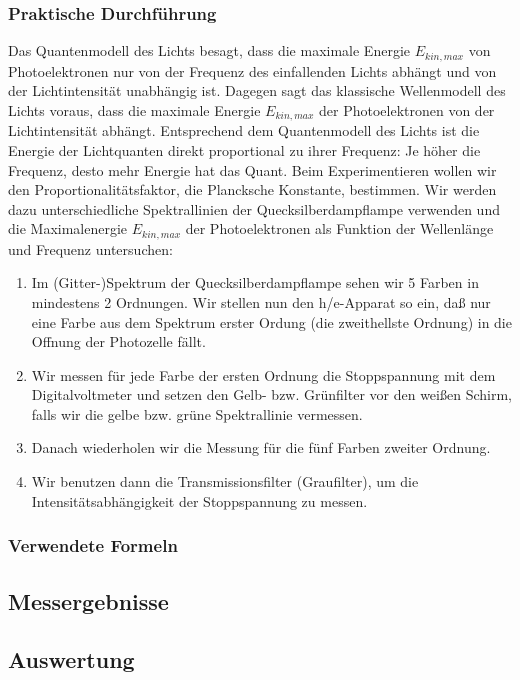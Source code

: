 \documentclass[12pt]{scrartcl}
\begin{document}
\subsubsection{Praktische Durchführung}
Das Quantenmodell des Lichts besagt, dass die maximale Energie $E_{kin,max}$ von Photoelektronen nur von der Frequenz des einfallenden Lichts abhängt und von der Lichtintensität unabhängig ist.
Dagegen sagt das klassische Wellenmodell des Lichts voraus, dass die maximale Energie $E_{kin,max}$ der Photoelektronen von der Lichtintensität abhängt.
Entsprechend dem Quantenmodell des Lichts ist die Energie der Lichtquanten direkt proportional zu ihrer Frequenz: Je höher die Frequenz, desto mehr Energie hat das Quant. Beim Experimentieren wollen wir den Proportionalitätsfaktor, die Plancksche Konstante, bestimmen.
Wir werden dazu unterschiedliche Spektrallinien der Quecksilberdampflampe verwenden und die Maximalenergie $E_{kin,max}$ der Photoelektronen als Funktion der Wellenlänge und Frequenz untersuchen:
\begin{enumerate}
\item Im (Gitter-)Spektrum der Quecksilberdampflampe sehen wir 5 Farben in mindestens 2 Ordnungen.
Wir stellen nun den h/e-Apparat so ein, daß nur eine Farbe aus dem Spektrum erster Ordung (die zweithellste Ordnung) in die Offnung der Photozelle fällt.
\item Wir messen für jede Farbe der ersten Ordnung die Stoppspannung mit dem Digitalvoltmeter und setzen den
Gelb- bzw. Grünfilter vor den weißen Schirm, falls wir die gelbe bzw. grüne Spektrallinie vermessen.
\item Danach wiederholen wir die Messung für die fünf Farben zweiter Ordnung.
\item Wir benutzen dann die Transmissionsfilter (Graufilter), um die Intensitätsabhängigkeit der Stoppspannung zu messen.
\end{enumerate}
\subsubsection{Verwendete Formeln}
\subsection{Messergebnisse}
\subsection{Auswertung}
\end{document}
